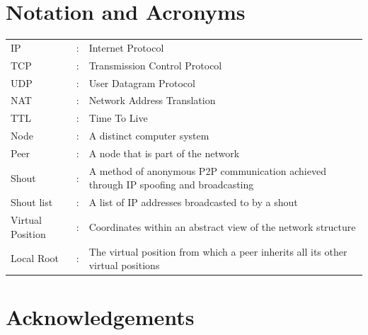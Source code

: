\documentclass[ %
                    author={Luke Murray},
                supervisor={Dr. Simon Hollis},
                     title={Shadow Peer-to-Peer Networks},
                  subtitle={},
                    degree={MEng},
                      year={2013} ]{thesis}
\begin{document}
\chapter*{Notation and Acronyms}

\begin{tabular}{lcl}
IP                &:     & Internet Protocol\\
TCP               &:     & Transmission Control Protocol\\
UDP               &:     & User Datagram Protocol\\
NAT               &:     & Network Address Translation\\
TTL               &:     & Time To Live\\

Node              &:     & A distinct computer system\\
Peer              &:     & A node that is part of the network\\
Shout             &:     & A method of anonymous P2P communication achieved through IP spoofing and broadcasting\\
Shout list        &:     & A list of IP addresses broadcasted to by a shout\\
Virtual Position  &:     & Coordinates within an abstract view of the network structure\\
Local Root        &:     & The virtual position from which a peer inherits all its other virtual positions\\

\end{tabular}


\chapter*{Acknowledgements}

\end{document}
